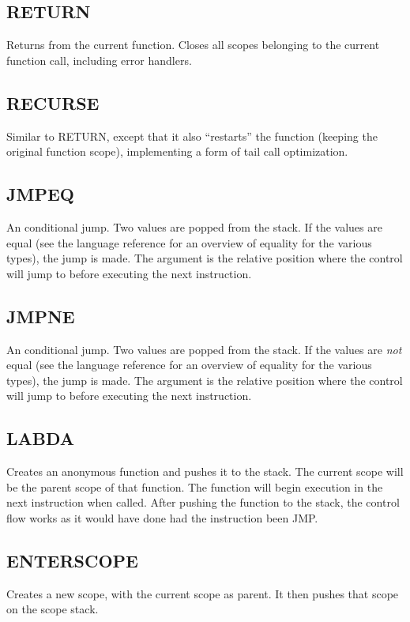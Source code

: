 \subsection{RETURN}
\label{sec:return}
Returns from the current function. Closes all scopes belonging to the
current function call, including error handlers.

\subsection{RECURSE}
\label{sec:recurse}
Similar to RETURN, except that it also ``restarts'' the function
(keeping the original function scope), implementing a form of tail call
optimization.

\subsection{JMPEQ}
\label{sec:jmpeq}
An conditional jump. Two values are popped from the stack. If the values
are equal (see the language reference for an overview of equality for
the various types), the jump is made. The argument is the relative
position where the control will jump to before executing the next
instruction.

\subsection{JMPNE}
\label{sec:jmpne}
An conditional jump. Two values are popped from the stack. If the values
are \emph{not} equal (see the language reference for an overview of
equality for the various types), the jump is made. The argument is the
relative position where the control will jump to before executing the
next instruction.

\subsection{LABDA}
\label{sec:labda}
Creates an anonymous function and pushes it to the stack. The current
scope will be the parent scope of that function. The function will begin
execution in the next instruction when called. After pushing the
function to the stack, the control flow works as it would have done had
the instruction been JMP.

\subsection{ENTER\textunderscore{}SCOPE}
\label{sec:enterscope}
Creates a new scope, with the current scope as parent. It then pushes
that scope on the scope stack.

